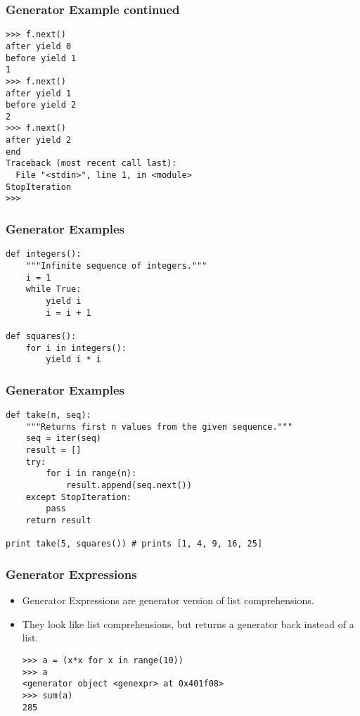 \begin{frame}[fragile]\frametitle{Generator Example continued}
\begin{lstlisting}
>>> f.next()
after yield 0
before yield 1
1
>>> f.next()
after yield 1
before yield 2
2
>>> f.next()
after yield 2
end
Traceback (most recent call last):
  File "<stdin>", line 1, in <module>
StopIteration
>>>
\end{lstlisting}
\end{frame}

\begin{frame}[fragile]\frametitle{Generator Examples}
\begin{lstlisting}
def integers():
    """Infinite sequence of integers."""
    i = 1
    while True:
        yield i
        i = i + 1
        
def squares():
    for i in integers():
        yield i * i
\end{lstlisting}
\end{frame}

\begin{frame}[fragile]\frametitle{Generator Examples}
\begin{lstlisting}
def take(n, seq):
    """Returns first n values from the given sequence."""
    seq = iter(seq)
    result = []
    try:
        for i in range(n):
            result.append(seq.next())
    except StopIteration:
        pass
    return result

print take(5, squares()) # prints [1, 4, 9, 16, 25]
\end{lstlisting}
\end{frame}




\begin{frame}[fragile]\frametitle{Generator Expressions}

    \begin{itemize}
    \item  Generator Expressions are generator version of list comprehensions. 
    \item They look like list comprehensions, but returns a generator back instead of a list.
\begin{lstlisting}
>>> a = (x*x for x in range(10))
>>> a
<generator object <genexpr> at 0x401f08>
>>> sum(a)
285
\end{lstlisting}
    \end{itemize}
\end{frame}

